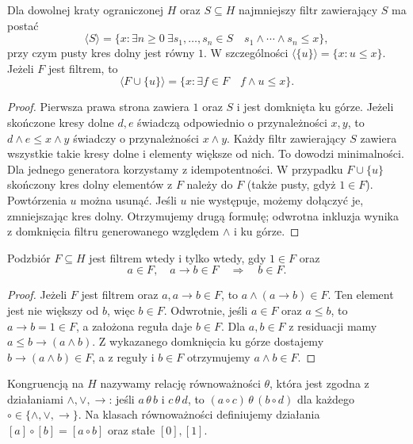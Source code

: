 \begin{lemat}
\label{lem:ncl-heyting-generated-filter}
Dla dowolnej kraty ograniczonej $H$ oraz $S\subseteq H$
najmniejszy filtr zawierający $S$
ma postać
\[
 \langle S\rangle
 =\{x:\exists n\geq0\ \exists s_1,\ldots,s_n\in S
                \quad s_1\wedge\cdots\wedge s_n\leq x\},
\]
przy czym pusty kres dolny jest równy $1$.
W szczególności $\langle\{u\}\rangle=\{x:u\leq x\}$.
Jeżeli $F$ jest filtrem, to
\[
 \langle F\cup\{u\}\rangle
 =\{x:\exists f\in F\quad f\wedge u\leq x\}.
\]
\end{lemat}
\begin{proof}
Pierwsza prawa strona zawiera $1$ oraz $S$
i jest domknięta ku górze. Jeżeli skończone kresy
dolne $d,e$ świadczą odpowiednio o przynależności
$x,y$, to $d\wedge e\leq x\wedge y$ świadczy
o przynależności $x\wedge y$.
Każdy filtr zawierający $S$ zawiera wszystkie
takie kresy dolne i elementy większe od nich.
To dowodzi minimalności.
Dla jednego generatora korzystamy z idempotentności.
W przypadku $F\cup\{u\}$ skończony kres dolny
elementów z $F$ należy do $F$ (także pusty,
gdyż $1\in F$). Powtórzenia $u$ można usunąć.
Jeśli $u$ nie występuje, możemy dołączyć je,
zmniejszając kres dolny. Otrzymujemy drugą formułę;
odwrotna inkluzja wynika z domknięcia filtru
generowanego względem $\wedge$ i ku górze.
\end{proof}

\begin{stwierdzenie}
\label{prop:ncl-heyting-filter-mp}
Podzbiór $F\subseteq H$ jest filtrem wtedy i tylko
wtedy, gdy $1\in F$ oraz
\[
 a\in F,\quad a\to b\in F\quad\Longrightarrow\quad b\in F.
\]
\end{stwierdzenie}
\begin{proof}
Jeżeli $F$ jest filtrem oraz $a,a\to b\in F$,
to $a\wedge(a\to b)\in F$. Ten element
jest nie większy od $b$, więc $b\in F$.
Odwrotnie, jeśli $a\in F$ oraz $a\leq b$,
to $a\to b=1\in F$, a założona reguła daje $b\in F$.
Dla $a,b\in F$ z residuacji mamy
$a\leq b\to(a\wedge b)$.
Z wykazanego domknięcia ku górze dostajemy
$b\to(a\wedge b)\in F$, a z reguły i $b\in F$
otrzymujemy $a\wedge b\in F$.
\end{proof}

\begin{definicja}
\label{def:ncl-heyting-congruence}
Kongruencją na $H$ nazywamy relację równoważności
$\theta$, która jest zgodna z działaniami
$\wedge,\vee,\to$: jeśli $a\,\theta\,b$
i $c\,\theta\,d$, to
$(a\circ c)\,\theta\,(b\circ d)$ dla każdego
$\circ\in\{\wedge,\vee,\to\}$.
Na klasach równoważności definiujemy działania
$[a]\circ[b]=[a\circ b]$ oraz stałe $[0],[1]$.
\end{definicja}

